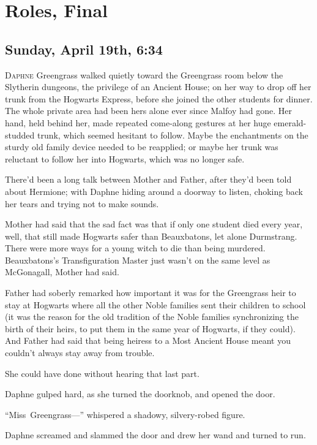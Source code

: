 \chapter{Roles, Final}

\section{Sunday, April 19th, 6:34\pm}

\lettrine{D}{aphne} Greengrass walked quietly toward the Greengrass room below the Slytherin dungeons, the privilege of an Ancient House; on her way to drop off her trunk from the Hogwarts Express, before she joined the other students for dinner. The whole private area had been hers alone ever since Malfoy had gone. Her hand, held behind her, made repeated come-along gestures at her huge emerald-studded trunk, which seemed hesitant to follow. Maybe the enchantments on the sturdy old family device needed to be reapplied; or maybe her trunk was reluctant to follow her into Hogwarts, which was no longer safe.

There’d been a long talk between Mother and Father, after they’d been told about Hermione; with Daphne hiding around a doorway to listen, choking back her tears and trying not to make sounds.

Mother had said that the sad fact was that if only one student died every year, well, that still made Hogwarts safer than Beauxbatons, let alone Durmstrang. There were more ways for a young witch to die than being murdered. Beauxbatons’s Transfiguration Master just wasn’t on the same level as McGonagall, Mother had said.

Father had soberly remarked how important it was for the Greengrass heir to stay at Hogwarts where all the other Noble families sent their children to school (it was the reason for the old tradition of the Noble families synchronizing the birth of their heirs, to put them in the same year of Hogwarts, if they could). And Father had said that being heiress to a Most Ancient House meant you couldn’t always stay away from trouble.

She could have done without hearing that last part.

Daphne gulped hard, as she turned the doorknob, and opened the door.

“Miss~Greengrass—” whispered a shadowy, silvery-robed figure.

Daphne screamed and slammed the door and drew her wand and turned to run.

